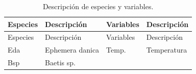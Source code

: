 \documentclass[
  spanish,
]{article}
\begin{document}
\begin{longtable}[]{@{}llll@{}}
\caption{Descripción de especies y variables.}\tabularnewline
\toprule
\begin{minipage}[b]{0.12\columnwidth}\raggedright
Especies\strut
\end{minipage} & \begin{minipage}[b]{0.27\columnwidth}\raggedright
Descripción\strut
\end{minipage} & \begin{minipage}[b]{0.14\columnwidth}\raggedright
Variables\strut
\end{minipage} & \begin{minipage}[b]{0.35\columnwidth}\raggedright
Descripción\strut
\end{minipage}\tabularnewline
\midrule
\endfirsthead
\toprule
\begin{minipage}[b]{0.12\columnwidth}\raggedright
Especies\strut
\end{minipage} & \begin{minipage}[b]{0.27\columnwidth}\raggedright
Descripción\strut
\end{minipage} & \begin{minipage}[b]{0.14\columnwidth}\raggedright
Variables\strut
\end{minipage} & \begin{minipage}[b]{0.35\columnwidth}\raggedright
Descripción\strut
\end{minipage}\tabularnewline
\midrule
\endhead
\begin{minipage}[t]{0.12\columnwidth}\raggedright
Eda\strut
\end{minipage} & \begin{minipage}[t]{0.27\columnwidth}\raggedright
Ephemera danica\strut
\end{minipage} & \begin{minipage}[t]{0.14\columnwidth}\raggedright
Temp.\strut
\end{minipage} & \begin{minipage}[t]{0.35\columnwidth}\raggedright
Temperatura\strut
\end{minipage}\tabularnewline
\begin{minipage}[t]{0.12\columnwidth}\raggedright
Bsp\strut
\end{minipage} & \begin{minipage}[t]{0.27\columnwidth}\raggedright
Baetis sp.\strut
\end{minipage} & \begin{minipage}[t]{0.14\columnwidth}\raggedright

\end{minipage}
\end{longtable}
\end{document}
